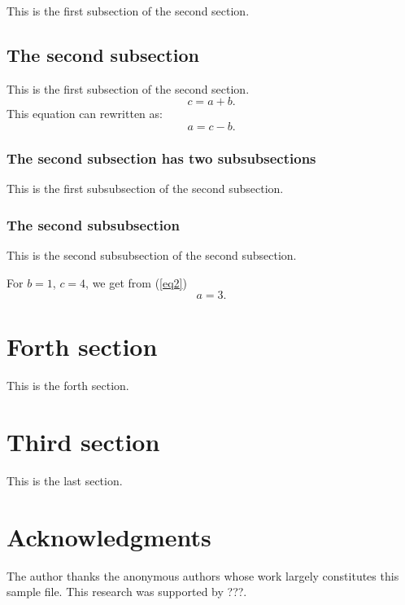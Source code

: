 \documentclass[10pt]{ijnam}
\begin{document}
This is the first subsection of the second section.

\subsection{The second subsection}

This is the first subsection of the second section.
\begin{equation}
c=a+b.
\end{equation}
This equation can rewritten as:
\begin{equation}\label{eq2}
a=c-b.
\end{equation}

\subsubsection{The second subsection has two subsubsections}

This is the first subsubsection of the second subsection.

\subsubsection{The second subsubsection}

This is the second subsubsection of the second subsection.

For $b=1$, $c=4$, we get from (\ref{eq2})
\begin{equation}
a=3.
\end{equation}

\section{Forth section}

This is the forth section.

\section{Third section}

This is the last section.

\section*{Acknowledgments}
The author thanks the anonymous authors whose work largely
constitutes this sample file. This research was supported by ???.
\end{document}
